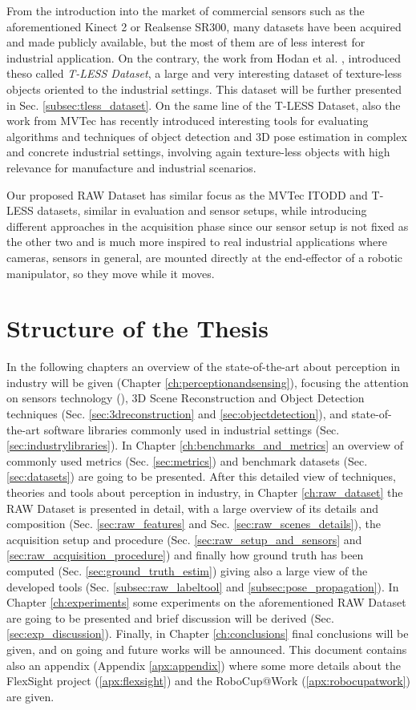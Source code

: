 From the introduction into the market of commercial sensors such as the aforementioned Kinect 2 or Realsense SR300, many datasets have been acquired and made publicly available, but the most of them are of less interest for industrial application. On the contrary, the work from Hodan et al. \cite{hodan2017tless}, introduced theso called \emph{T-LESS Dataset}, a large and very interesting dataset of texture-less objects oriented to the industrial settings. This dataset will be further presented in Sec. \ref{subsec:tless_dataset}. On the same line of the T-LESS Dataset, also the work from MVTec \cite{mvtec2017itodd} has recently introduced interesting tools for evaluating algorithms and techniques of object detection and 3D pose estimation in complex and concrete industrial settings, involving again texture-less objects with high relevance for manufacture and industrial scenarios. 

Our proposed RAW Dataset has similar focus as the MVTec ITODD and T-LESS datasets, similar in evaluation and sensor setups, while introducing different approaches in the acquisition phase since our sensor setup is not fixed as the other two and is much more inspired to real industrial applications where cameras, sensors in general, are mounted directly at the end-effector of a robotic manipulator, so they move while it moves.

\section{Structure of the Thesis}\label{sec:thesisstructure}
In the following chapters an overview of the state-of-the-art about perception in industry will be given (Chapter \ref{ch:perceptionandsensing}), focusing the attention on sensors technology (), 3D Scene Reconstruction and Object Detection techniques (Sec. \ref{sec:3dreconstruction} and \ref{sec:objectdetection}), and state-of-the-art software libraries commonly used in industrial settings (Sec. \ref{sec:industrylibraries}). In Chapter \ref{ch:benchmarks_and_metrics} an overview of commonly used metrics (Sec. \ref{sec:metrics}) and benchmark datasets (Sec. \ref{sec:datasets}) are going to be presented. After this detailed view of techniques, theories and tools about perception in industry, in Chapter \ref{ch:raw_dataset} the RAW Dataset is presented in detail, with a large overview of its details and composition (Sec. \ref{sec:raw_features} and Sec. \ref{sec:raw_scenes_details}), the acquisition setup and procedure (Sec. \ref{sec:raw_setup_and_sensors} and \ref{sec:raw_acquisition_procedure}) and finally how ground truth has been computed (Sec. \ref{sec:ground_truth_estim}) giving also a large view of the developed tools (Sec. \ref{subsec:raw_labeltool} and \ref{subsec:pose_propagation}). In Chapter \ref{ch:experiments} some experiments on the aforementioned RAW Dataset are going to be presented and brief discussion will be derived (Sec. \ref{sec:exp_discussion}). Finally, in Chapter \ref{ch:conclusions} final conclusions will be given, and on going and future works will be announced. This document contains also an appendix (Appendix \ref{apx:appendix}) where some more details about the FlexSight project (\ref{apx:flexsight}) and the RoboCup@Work (\ref{apx:robocupatwork}) are given.